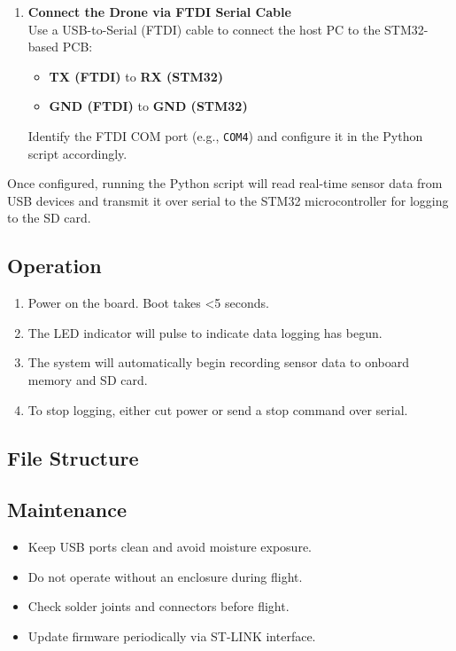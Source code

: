 \documentclass[../main.tex]{subfiles}
\begin{document}
\begin{enumerate}
    \item \textbf{Connect the Drone via FTDI Serial Cable} \\
    Use a USB-to-Serial (FTDI) cable to connect the host PC to the STM32-based PCB:
    \begin{itemize}
        \item \textbf{TX (FTDI)} to \textbf{RX (STM32)}
        \item \textbf{GND (FTDI)} to \textbf{GND (STM32)}
    \end{itemize}
    Identify the FTDI COM port (e.g., \texttt{COM4}) and configure it in the Python script accordingly.
\end{enumerate}

Once configured, running the Python script will read real-time sensor data from USB devices and transmit it over serial to the STM32 microcontroller for logging to the SD card.


\subsection{Operation}
\begin{enumerate}
    \item Power on the board. Boot takes <5 seconds.
    \item The LED indicator will pulse to indicate data logging has begun.
    \item The system will automatically begin recording sensor data to onboard memory and SD card.
    \item To stop logging, either cut power or send a stop command over serial.
\end{enumerate}

\subsection{File Structure}

\subsection{Maintenance}
\begin{itemize}
    \item Keep USB ports clean and avoid moisture exposure.
    \item Do not operate without an enclosure during flight.
    \item Check solder joints and connectors before flight.
    \item Update firmware periodically via ST-LINK interface.
\end{itemize}
\end{document}
